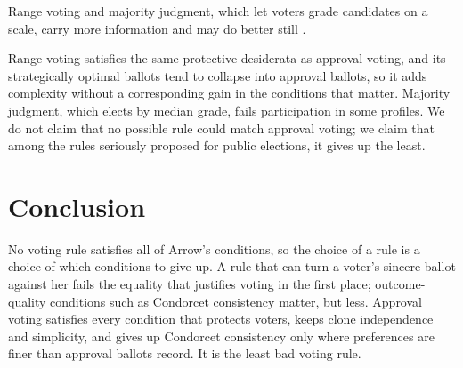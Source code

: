\documentclass{situationist-preprint}
\begin{document}
\begin{objection}
Range voting and majority judgment, which let voters grade candidates on a scale, carry more information and may do better still \citep{BalinskiLaraki2010}.
\end{objection}

\begin{reply}
Range voting satisfies the same protective desiderata as approval voting, and its strategically optimal ballots tend to collapse into approval ballots, so it adds complexity without a corresponding gain in the conditions that matter. Majority judgment, which elects by median grade, fails participation in some profiles. We do not claim that no possible rule could match approval voting; we claim that among the rules seriously proposed for public elections, it gives up the least.
\end{reply}

\section{Conclusion}

No voting rule satisfies all of Arrow's conditions, so the choice of a rule is a choice of which conditions to give up. A rule that can turn a voter's sincere ballot against her fails the equality that justifies voting in the first place; outcome-quality conditions such as Condorcet consistency matter, but less. Approval voting satisfies every condition that protects voters, keeps clone independence and simplicity, and gives up Condorcet consistency only where preferences are finer than approval ballots record. It is the least bad voting rule.
\end{document}
